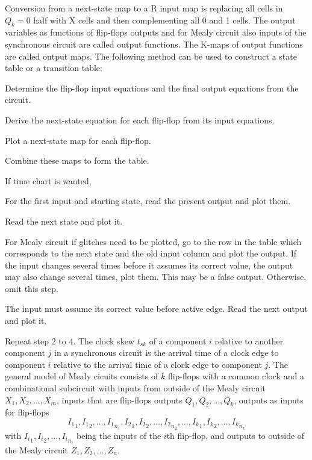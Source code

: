 \documentclass[a4paper,12pt]{report}
\begin{document}
Conversion from a next-state map to a R input map is replacing all cells in $Q_k=0$ half with X cells and then complementing all 0 and 1 cells.
The output variables as functions of flip-flops outputs and for Mealy circuit also inputs of the synchronous circuit are called output functions. The K-maps of output functions are called output maps.
The following method can be used to construct a state table or a transition table:
\ben
\item Determine the flip-flop input equations and the final output equations from the circuit.
\item Derive the next-state equation for each flip-flop from its input equations.
\item Plot a next-state map for each flip-flop.
\item Combine these maps to form the table.
\item If time chart is wanted,
\ben
\item For the first input and starting state, read the present output and plot them.
\item Read the next state and plot it.
\item For Mealy circuit if glitches need to be plotted, go to the row in the table which corresponds to the next state and the old input column and plot the output. If the input changes several times before it assumes its correct value, the output may also change several times, plot them. This may be a false output. Otherwise, omit this step.
\item The input must assume its correct value before active edge. Read the next output and plot it.
\item Repeat step 2 to 4.
\een
\een
{}
The clock skew $t_{sk}$ of a component $i$ relative to another component $j$ in a synchronous circuit is the arrival time of a clock edge to component $i$ relative to the arrival time of a clock edge to component $j$.
The general model of Mealy cicuits consists of $k$ flip-flops with a common clock and a combinational subcircuit with inputs from outside of the Mealy circuit $X_1,X_2,\ldots,X_m$, inputs that are flip-flops outputs $Q_1,Q_2,\ldots,Q_k$, outputs as inputs for flip-flops
\[{I_1}_1,{I_1}_2,\ldots,{I_1}_{n_1},{I_2}_1,{I_2}_2,\ldots,{I_2}_{n_2},\ldots,{I_k}_1,{I_k}_2,\ldots,{I_k}_{n_k}\]
with ${I_i}_1,{I_i}_2,\ldots,{I_i}_{n_i}$ being the inputs of the $i$th flip-flop, and outputs to outside of the Mealy circuit $Z_1,Z_2,\ldots,Z_n$.
\end{document}
